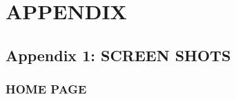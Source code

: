 \documentclass[11pt]{report} %
\begin{document}
\chapter{APPENDIX}


\section{Appendix 1: SCREEN SHOTS} 
\label{App:Appendix1}

\subsection{HOME PAGE}



\begin{appendix}    
	
\end{appendix}

%
%
\end{document}
